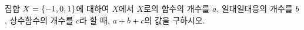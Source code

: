 집합 $X=\{-1{,}\mkern3mu\mathopen{}0{,}\mkern3mu\mathopen{}1\}$에 대하여 $X$에서 $X$로의 함수의 개수를 $a$, 일대일대응의 개수를 $b$, 상수함수의 개수를 $c$라 할 때, $a+b+c$의 값을 구하시오.
